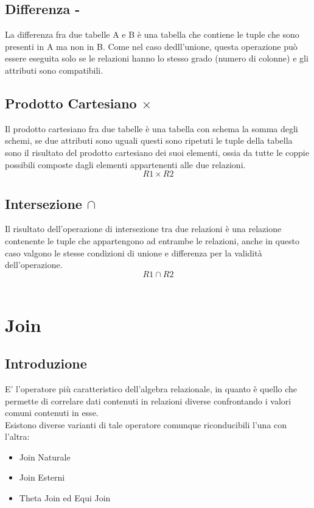 \documentclass{report}
\begin{document}
\subsection{Differenza -}
La differenza fra due tabelle A e B è una tabella che contiene le tuple che sono presenti in A ma non in
B. Come nel caso dedll'unione, questa operazione può essere eseguita solo se le relazioni hanno lo stesso grado (numero di colonne) e gli attributi sono compatibili.\\

\newpage
\subsection{Prodotto Cartesiano $\times$}
Il prodotto cartesiano fra due tabelle è una tabella con schema la somma degli schemi, se due attributi
sono uguali questi sono ripetuti le tuple della tabella sono il risultato del prodotto cartesiano dei suoi elementi, ossia da tutte le coppie possibili composte dagli elementi appartenenti alle due relazioni.\\
$$R1\times R2$$

\subsection{Intersezione $\cap$}
Il risultato dell'operazione di intersezione tra due relazioni è una relazione contenente le tuple che appartengono ad entrambe le relazioni, anche in questo caso valgono le stesse condizioni di unione e differenza per la validità dell'operazione.\\
$$R1 \cap R2$$\\

\section{Join}
\subsection{Introduzione}
E’ l’operatore più caratteristico dell’algebra relazionale, in quanto è quello che permette di correlare dati contenuti in relazioni diverse confrontando i valori comuni contenuti in esse.\\
Esistono diverse varianti di tale operatore comunque riconducibili l’una con l’altra:
\begin{itemize}
    \item Join Naturale
    \item Join Esterni
    \item Theta Join ed Equi Join\\
\end{itemize}
\end{document}
